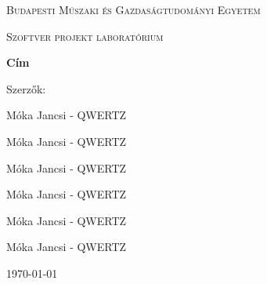 \begin{titlepage}
	\centering
	{\scshape\LARGE Budapesti Műszaki és Gazdaságtudományi Egyetem \par}
	\vspace{1cm}
	{\scshape\Large Szoftver projekt laboratórium\par}
	\vspace{1.5cm}
	{\huge\bfseries Cím\par}
	\vfill
	Szerzők:\par
	Móka Jancsi - QWERTZ\par
	Móka Jancsi - QWERTZ\par
	Móka Jancsi - QWERTZ\par
	Móka Jancsi - QWERTZ\par
	Móka Jancsi - QWERTZ\par
	Móka Jancsi - QWERTZ\par
	\vspace{2cm}
	{\large \today\par}
\end{titlepage}